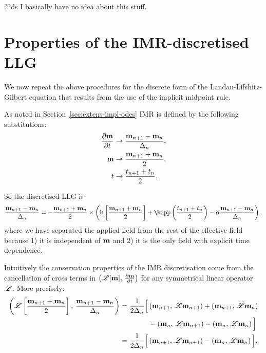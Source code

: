 ??ds I basically have no idea about this stuff.


\section{Properties of the IMR-discretised LLG}
\label{sec:prop-imr-llg}

We now repeat the above procedures for the discrete form of the Landau-Lifshitz-Gilbert equation that results from the use of the implicit midpoint rule.

As noted in Section~\ref{sec:extens-impl-odes} IMR is defined by the following substitutions:
\begin{align}
  \label{eq:55}
  \frac{\partial \mathbf{m}}{\partial t} &\rightarrow \frac{\mathbf{m}_{n+1} - \mathbf{m}_n}{\Delta_{n}}, \\
  \mathbf{m} &\rightarrow \frac{\mathbf{m}_{n+1} + \mathbf{m}_n}{2}, \\
  t &\rightarrow \frac{t_{n+1} + t_n}{2}.
\end{align}

So the discretised LLG is
\begin{equation}
  \frac{\mv_{n+1} - \mv_n}{\dtn} = - \frac{\mv_{n+1} + \mv_n}{2} \times
  \left(
  \hv \left[\frac{\mv_{n+1} + \mv_n}{2} \right]
  + \happ\left(\frac{t_{n+1} + t_n}{2}\right)
  - \dampc \frac{\mv_{n+1} - \mv_n}{\dtn}
  \right),
  \label{eqn:disc-llg}
\end{equation}
where we have separated the applied field from the rest of the effective field because 1) it is independent of $\mathbf{m}$ and 2) it is the only field with explicit time dependence.

Intuitively the conservation properties of the IMR discretisation come from the cancellation of cross terms in $\left(\mathscr{L}[\mathbf{m}],\, \frac{\partial \mathbf{m}}{\partial t} \right)$ for any symmetrical linear operator $\mathscr{L}$. More precisely:
\begin{equation}
  \begin{aligned}
    \label{eqn:imr-linop}
    \left(\mathscr{L} \left[ \frac{\mathbf{m}_{n+1} + \mathbf{m}_n}{2} \right],\,  \frac{\mathbf{m}_{n+1} - \mathbf{m}_n}{\Delta_{n}}  \right)
    &= \frac{1}{2\Delta_{n}} \Big[
      \left(\mathbf{m}_{n+1},\, \mathscr{L} \mathbf{m}_{n+1} \right) + \left(\mathbf{m}_{n+1},\, \mathscr{L} \mathbf{m}_{n} \right) \\
      & \qquad\qquad - \left(\mathbf{m}_{n},\, \mathscr{L} \mathbf{m}_{n+1} \right) - \left(\mathbf{m}_{n},\, \mathscr{L} \mathbf{m}_{n} \right)
      \Big] \\
    &= \frac{1}{2\Delta_{n}} \Big[
      \left(\mathbf{m}_{n+1},\, \mathscr{L} \mathbf{m}_{n+1} \right)
      - \left(\mathbf{m}_{n},\, \mathscr{L} \mathbf{m}_{n} \right)
      \Big].
  \end{aligned}
\end{equation}

